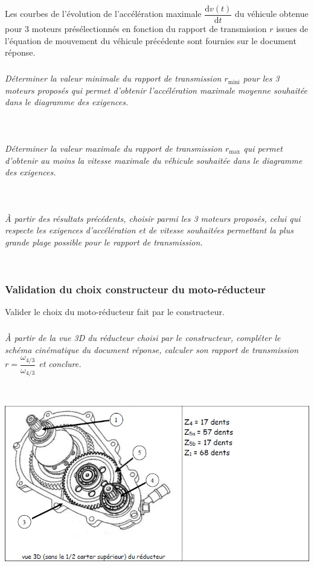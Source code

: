 \documentclass[10pt,fleqn]{article} %
\begin{document}
\begin{multicols}{2}
Les courbes de l’évolution de l’accélération maximale $\dfrac{\text{d} v(t)}{\text{d} t}$
du véhicule obtenue pour 3 moteurs présélectionnés en fonction du rapport de transmission $r$ issues de l’équation de mouvement du véhicule précédente sont fournies sur le document réponse.




\subparagraph{}\textit{Déterminer la valeur minimale du rapport de transmission $r_{\text{mini}}$ pour les 3 moteurs proposés qui permet d’obtenir l’accélération maximale moyenne souhaitée dans le diagramme des exigences.}
\ifprof
\begin{corrige}~\\
\end{corrige}
\else
\fi


\subparagraph{}\textit{Déterminer la valeur maximale du rapport de transmission $r_{\text{max}}$ qui permet d’obtenir au moins la vitesse maximale du véhicule souhaitée dans le diagramme des exigences.}
\ifprof
\begin{corrige}~\\
\end{corrige}
\else
\fi


\subparagraph{}\textit{À partir des résultats précédents, choisir parmi les 3 moteurs proposés, celui qui respecte les exigences d’accélération et de vitesse souhaitées permettant la plus grande plage possible pour le rapport de transmission.}
\ifprof
\begin{corrige}~\\
\end{corrige}
\else
\fi


\subsubsection*{Validation du choix constructeur du moto-réducteur}
\begin{obj}
Valider le choix du moto-réducteur fait par le constructeur.
\end{obj}

\subparagraph{}\textit{À partir de la vue 3D du réducteur choisi par le constructeur, compléter le schéma cinématique du document réponse, calculer son rapport de transmission $r = \dfrac{\omega_{4/3}}{\omega_{4/3}}$ et conclure.}
\ifprof
\begin{corrige}~\\
\end{corrige}
\else
\fi


\begin{center}
\includegraphics[width=\linewidth]{images/fig_05}
\end{center}


\end{multicols}
\end{document}
